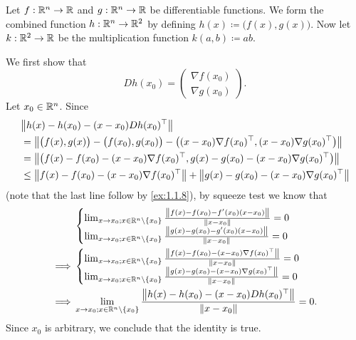 \begin{eg}\label{6.4.2}
  Let \(f : \R^n \to \R\) and \(g : \R^n \to \R\) be differentiable functions.
  We form the combined function \(h : \R^n \to \R^2\) by defining \(h(x) \coloneqq \big(f(x), g(x)\big)\).
  Now let \(k : \R^2 \to \R\) be the multiplication function \(k(a, b) \coloneqq ab\).

  We first show that
  \[
    D h(x_0) = \begin{pmatrix}
      \nabla f(x_0) \\
      \nabla g(x_0)
    \end{pmatrix}.
  \]
  Let \(x_0 \in \R^n\).
  Since
  \begin{align*}
     & \norm*{h(x) - h(x_0) - (x - x_0) D h(x_0)^\top}                                                                                  \\
     & = \norm*{\big(f(x), g(x)\big) - \big(f(x_0), g(x_0)\big) - \big((x - x_0) \nabla f(x_0)^\top, (x - x_0) \nabla g(x_0)^\top\big)} \\
     & = \norm*{\big(f(x) - f(x_0) - (x - x_0) \nabla f(x_0)^\top, g(x) - g(x_0) - (x - x_0) \nabla g(x_0)^\top\big)}                   \\
     & \leq \norm*{f(x) - f(x_0) - (x - x_0) \nabla f(x_0)^\top} + \norm*{g(x) - g(x_0) - (x - x_0) \nabla g(x_0)^\top}
  \end{align*}
  (note that the last line follow by \cref{ex:1.1.8}),
  by squeeze test we know that
  \begin{align*}
             & \begin{cases}
                 \lim_{x \to x_0 ; x \in \R^n \setminus \{x_0\}} \frac{\norm*{f(x) - f(x_0) - f'(x_0)(x - x_0)}}{\norm*{x - x_0}} = 0 \\
                 \lim_{x \to x_0 ; x \in \R^n \setminus \{x_0\}} \frac{\norm*{g(x) - g(x_0) - g'(x_0)(x - x_0)}}{\norm*{x - x_0}} = 0
               \end{cases}                    \\
    \implies & \begin{cases}
                 \lim_{x \to x_0 ; x \in \R^n \setminus \{x_0\}} \frac{\norm*{f(x) - f(x_0) - (x - x_0) \nabla f(x_0)^\top}}{\norm*{x - x_0}} = 0 \\
                 \lim_{x \to x_0 ; x \in \R^n \setminus \{x_0\}} \frac{\norm*{g(x) - g(x_0) - (x - x_0) \nabla g(x_0)^\top}}{\norm*{x - x_0}} = 0
               \end{cases}                    \\
    \implies & \lim_{x \to x_0 ; x \in \R^n \setminus \{x_0\}} \frac{\norm*{h(x) - h(x_0) - (x - x_0) D h(x_0)^\top}}{\norm*{x - x_0}} = 0.
  \end{align*}
  Since \(x_0\) is arbitrary, we conclude that the identity is true.


\end{eg}
